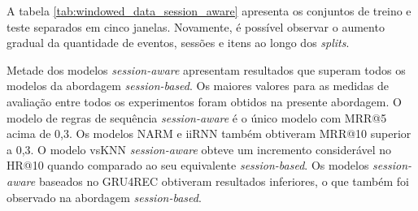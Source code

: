 A tabela \ref{tab:windowed_data_session_aware} apresenta os conjuntos de treino
e teste separados em cinco janelas. Novamente, é possível observar o aumento
gradual da quantidade de eventos, sessões e itens ao longo dos \textit{splits}.

Metade dos modelos \textit{session-aware} apresentam resultados que superam
todos os modelos da abordagem \textit{session-based}. Os maiores valores para as
medidas de avaliação entre todos os experimentos foram obtidos na presente
abordagem. O modelo de regras de sequência \textit{session-aware} é o único
modelo com MRR@5 acima de 0,3. Os modelos NARM e iiRNN também obtiveram MRR@10
superior a 0,3. O modelo vsKNN \textit{session-aware} obteve um incremento
considerável no HR@10 quando comparado ao seu equivalente
\textit{session-based}. Os modelos \textit{session-aware} baseados no GRU4REC
obtiveram resultados inferiores, o que também foi observado na abordagem
\textit{session-based}.

